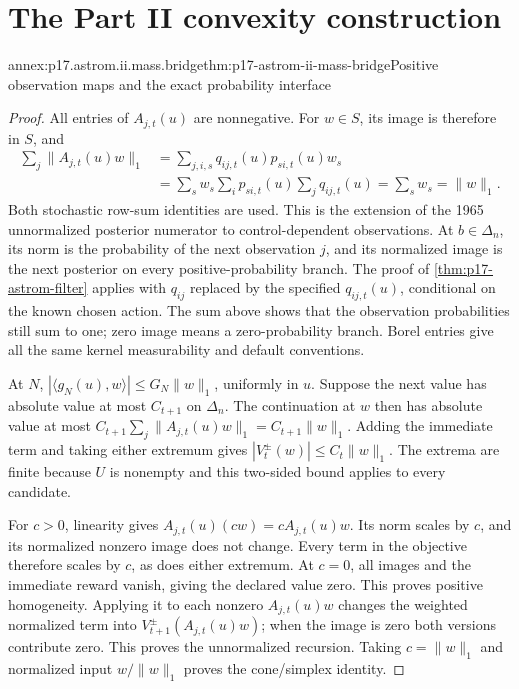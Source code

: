 \section{The Part II convexity construction}
\label{sec:annex-p17-astrom-incomplete-information-ii}

\begin{annexitem}{annex:p17.astrom.ii.mass.bridge}{thm:p17-astrom-ii-mass-bridge}{Positive observation maps and the exact probability interface}
\begin{proof}
All entries of \(A_{j,t}(u)\) are nonnegative.
For \(w\in S\), its image is therefore in \(S\), and
\[
 \begin{split}
 \sum_j\|A_{j,t}(u)w\|_1
 &=\sum_{j,i,s}q_{ij,t}(u)p_{si,t}(u)w_s\\
 &=\sum_s w_s\sum_i p_{si,t}(u)\sum_jq_{ij,t}(u)
 =\sum_s w_s=\|w\|_1 .
 \end{split}
\]
Both stochastic row-sum identities are used.
This is the extension of the 1965 unnormalized
posterior numerator to control-dependent observations.
At \(b\in\Delta_n\), its norm is the probability of
the next observation \(j\), and its normalized image
is the next posterior on every positive-probability
branch. The proof of \cref{thm:p17-astrom-filter}
applies with \(q_{ij}\) replaced by the specified
\(q_{ij,t}(u)\), conditional on the known chosen action.
The sum above shows that the observation probabilities
still sum to one; zero image means a zero-probability
branch. Borel entries give all the same kernel
measurability and default conventions.

At \(N\), \(|\langle g_N(u),w\rangle|
\leq G_N\|w\|_1\), uniformly in \(u\).
Suppose the next value has absolute value at most
\(C_{t+1}\) on \(\Delta_n\).
The continuation at \(w\) then has absolute value
at most
\(C_{t+1}\sum_j\|A_{j,t}(u)w\|_1
 =C_{t+1}\|w\|_1\).
Adding the immediate term and taking either extremum
gives \(|V_t^\pm(w)|\leq C_t\|w\|_1\).
The extrema are finite because \(U\) is nonempty
and this two-sided bound applies to every candidate.

For \(c>0\), linearity gives
\(A_{j,t}(u)(cw)=cA_{j,t}(u)w\).
Its norm scales by \(c\), and its normalized nonzero
image does not change. Every term in the objective
therefore scales by \(c\), as does either extremum.
At \(c=0\), all images and the immediate reward
vanish, giving the declared value zero.
This proves positive homogeneity. Applying it to
each nonzero \(A_{j,t}(u)w\) changes the weighted
normalized term into \(V_{t+1}^\pm(A_{j,t}(u)w)\);
when the image is zero both versions contribute
zero. This proves the unnormalized recursion.
Taking \(c=\|w\|_1\) and normalized input
\(w/\|w\|_1\) proves the cone/simplex identity.


\end{proof}
\end{annexitem}
